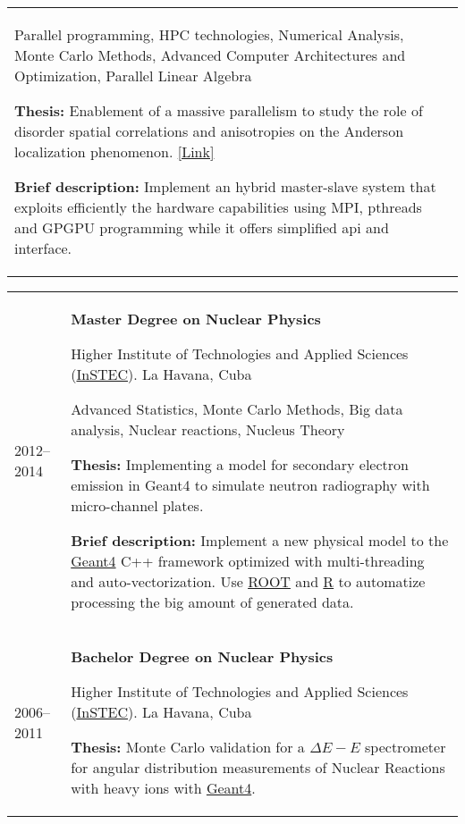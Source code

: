 \documentclass[a4paper,11pt]{article}
\begin{document}
\begin{tabularx}{\linewidth}{@{}l X@{}}
               Parallel programming, HPC technologies, Numerical Analysis, Monte
               Carlo Methods, Advanced Computer Architectures and Optimization,
               Parallel Linear Algebra

               \textbf{Thesis:} Enablement of a massive parallelism to study the role of disorder
               spatial correlations and anisotropies on the Anderson localization phenomenon.
               \href{https://backend.mhpc.sissa.it/sites/default/files/2021-02/JimmyAguilarMena.pdf}{[Link]}

               \textbf{Brief description:} Implement an hybrid master-slave system that exploits efficiently
               the hardware capabilities using MPI, pthreads and GPGPU programming while it offers
               simplified api and interface.
  \\
\end{tabularx}

\begin{tabularx}{\linewidth}{@{}l X@{}}
  2012--2014 & \textbf{Master Degree on Nuclear Physics}

               Higher Institute of Technologies and Applied Sciences (\href{www.instec.cu}{InSTEC}).
               La Havana, Cuba

               Advanced Statistics, Monte Carlo Methods, Big data analysis, Nuclear reactions, Nucleus Theory

               \textbf{Thesis:} Implementing a model for secondary electron emission in Geant4 to
               simulate neutron radiography with micro-channel plates.

               \textbf{Brief description:} Implement a new physical model to the
               \href{https://geant4.web.cern.ch/}{Geant4} C++ framework optimized with multi-threading
               and auto-vectorization. Use \href{https://root.cern/}{ROOT} and
               \href{https://www.r-project.org/}{R} to automatize processing the big amount of
               generated data.
  \\
  2006--2011 & \textbf{Bachelor Degree on Nuclear Physics}

               Higher Institute of Technologies and Applied Sciences (\href{www.instec.cu}{InSTEC}).
               La Havana, Cuba

               \textbf{Thesis:} Monte Carlo validation for a $\Delta E-E$ spectrometer for angular
               distribution measurements of Nuclear Reactions with heavy ions with
               \href{https://geant4.web.cern.ch/}{Geant4}.
  \\
\end{tabularx}
\end{document}
